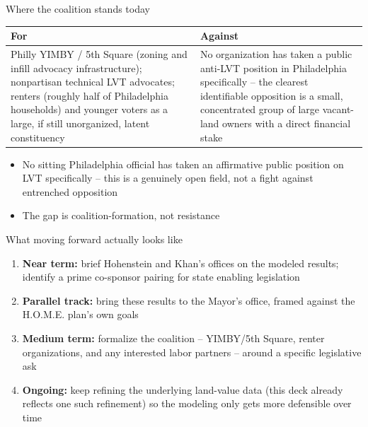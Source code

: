 \documentclass[aspectratio=169,11pt]{beamer}
\begin{document}
\begin{frame}{Where the coalition stands today}
\begin{center}
\begin{tabularx}{0.96\linewidth}{@{} X X @{}}
\toprule
\textbf{For} & \textbf{Against} \\
\midrule
Philly YIMBY / 5th Square (zoning and infill advocacy infrastructure); nonpartisan technical LVT advocates; renters (roughly half of Philadelphia households) and younger voters as a large, if still unorganized, latent constituency &
No organization has taken a public anti-LVT position in Philadelphia specifically -- the clearest identifiable opposition is a small, concentrated group of large vacant-land owners with a direct financial stake \\
\bottomrule
\end{tabularx}
\end{center}
\vspace{0.8em}
\begin{itemize}
\item No sitting Philadelphia official has taken an affirmative public position on LVT specifically -- this is a genuinely open field, not a fight against entrenched opposition
\item The gap is coalition-formation, not resistance
\end{itemize}
\end{frame}

\begin{frame}{What moving forward actually looks like}
\begin{enumerate}
\item \textbf{Near term:} brief Hohenstein and Khan's offices on the modeled results; identify a prime co-sponsor pairing for state enabling legislation
\item \textbf{Parallel track:} bring these results to the Mayor's office, framed against the H.O.M.E. plan's own goals
\item \textbf{Medium term:} formalize the coalition -- YIMBY/5th Square, renter organizations, and any interested labor partners -- around a specific legislative ask
\item \textbf{Ongoing:} keep refining the underlying land-value data (this deck already reflects one such refinement) so the modeling only gets more defensible over time
\end{enumerate}
\end{frame}
\end{document}

